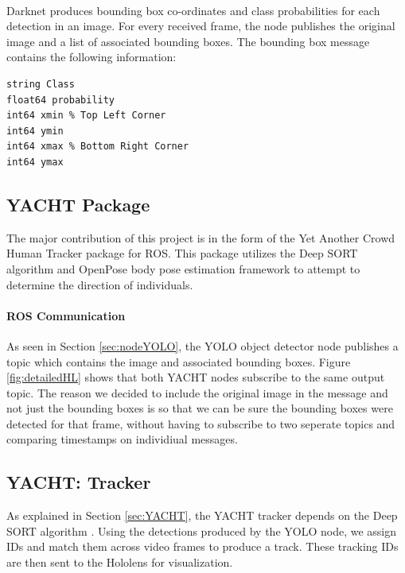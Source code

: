 \paragraph{} Darknet produces bounding box co-ordinates and class probabilities for each detection in an image. For every received frame, the node publishes the original image and a list of associated bounding boxes. The bounding box message contains the following information: \\

\begin{lstlisting}[language=Mymatlab,caption={BoundingBox.msg},label={bbmsg}]
string Class
float64 probability
int64 xmin % Top Left Corner
int64 ymin
int64 xmax % Bottom Right Corner
int64 ymax
\end{lstlisting}

\subsection{YACHT Package}
The major contribution of this project is in the form of the Yet Another Crowd Human Tracker package for ROS. This package utilizes the Deep SORT algorithm and OpenPose body pose estimation framework to attempt to determine the direction of individuals.


\paragraph{ROS Communication} As seen in Section \ref{sec:nodeYOLO}, the YOLO object detector node publishes a topic which contains the image and associated bounding boxes. Figure \ref{fig:detailedHL} shows that both YACHT nodes subscribe to the same output topic. The reason we decided to include the original image in the message and not just the bounding boxes is so that we can be sure the bounding boxes were detected for that frame, without having to subscribe to two seperate topics and comparing timestamps on individiual messages.

\subsection{YACHT: Tracker}
As explained in Section \ref{sec:YACHT}, the YACHT tracker depends on the Deep SORT algorithm \cite{Wojke2018}. Using the detections produced by the YOLO node, we assign IDs and match them across video frames to produce a track. These tracking IDs are then sent to the Hololens for visualization.



